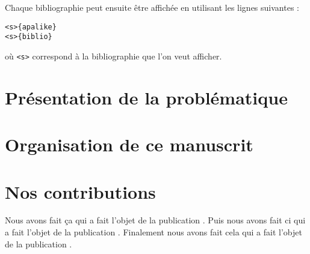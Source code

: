 Chaque bibliographie peut ensuite être affichée en utilisant les lignes suivantes :

\begin{framed}
\begin{verbatim}<s>{apalike}
<s>{biblio}
\end{verbatim}\vspace{-0.5em}
\end{framed}

où \verb|<s>| correspond à la bibliographie que l'on veut afficher.


\section{Présentation de la problématique}

\section{Organisation de ce manuscrit}

\section{Nos contributions}

Nous avons fait ça qui a fait l'objet de la publication . Puis nous avons fait ci qui a fait l'objet de la publication . Finalement nous avons fait cela qui a fait l'objet de la publication .
 

  
\renewcommand{\bibtitle}{\section*{\refname}}


